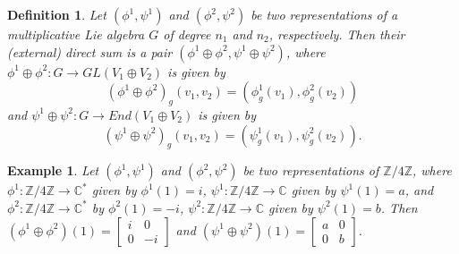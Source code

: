 \documentclass[10 pt,oneside,reqno,a4paper]{amsart}
\newtheorem{definition}{Definition}[section]
\newtheorem{example}[theorem]{Example}
\numberwithin{equation}{section}
\newcommand{\field}[1]{\mathbb{#1}}          \newcommand{\Q}{\field{Q}}
\newcommand{\C}{\field{C}}                   \newcommand{\A}{\field{A}}
\begin{document}
\begin{definition}
    Let $(\phi^1,\psi^1)$ and $(\phi^2,\psi^2)$ be two representations of a multiplicative Lie algebra $G$ of degree $n_1$ and $n_2$, respectively. Then their (external) direct sum is a pair $(\phi^1 \oplus \phi^2,\psi^1\oplus \psi^2 )$, where $\phi^1 \oplus \phi^2: G \to GL(V_1 \oplus V_2)$ is given by $$(\phi^1 \oplus \phi^2)_g(v_1, v_2)= (\phi^1_g(v_1),\phi^2_g(v_2))$$ and $\psi^1 \oplus \psi^2: G \to End(V_1 \oplus V_2)$ is given by $$(\psi^1 \oplus \psi^2)_g(v_1, v_2)= (\psi^1_g(v_1),\psi^2_g(v_2)).$$
\end{definition}
\begin{example}
    Let $(\phi^1,\psi^1)$ and $(\phi^2,\psi^2)$ be two representations of $\mathbb{Z}/4\mathbb{Z}$, where $\phi^1: \mathbb{Z}/4\mathbb{Z} \to \C^*$ given by $\phi^1(1)=i$, $\psi^1: \mathbb{Z}/4\mathbb{Z} \to \C$ given by $\psi^1(1)=a$, and $\phi^2: \mathbb{Z}/4\mathbb{Z} \to \C^*$ by $\phi^2(1)=-i$, $\psi^2: \mathbb{Z}/4\mathbb{Z} \to \C$ given by $\psi^2(1)=b$. Then $(\phi^1 \oplus \phi^2)(1)=\begin{bmatrix}
        i & 0 \\ 0 & -i
    \end{bmatrix}$ and $(\psi^1 \oplus \psi^2)(1)=\begin{bmatrix}
        a & 0 \\ 0 & b
    \end{bmatrix}$.
\end{example}
\end{document}
